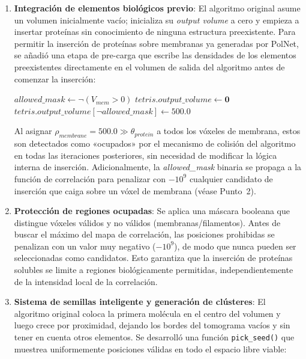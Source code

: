 \begin{enumerate}
    \item \textbf{Integración de elementos biológicos previo}: El algoritmo original asume un volumen inicialmente vacío; inicializa su \textit{output volume} a cero y empieza a insertar proteínas sin conocimiento de ninguna estructura preexistente. Para permitir la inserción de proteínas sobre membranas ya generadas por PolNet, se añadió una etapa de pre-carga que escribe las densidades de los elementos preexistentes directamente en el volumen de salida del algoritmo antes de comenzar la inserción:

    \begin{algorithm}[H]
        \caption{Pre-carga de membrana en el volumen Tetris}
        \label{alg:preload}
        $allowed\_mask \gets \lnot(V_{mem} > 0)$ 
        $tetris.output\_volume \gets \mathbf{0}$ 
        $tetris.output\_volume[\lnot allowed\_mask] \gets 500.0$ 
    \end{algorithm}

    Al asignar $\rho_{membrane} = 500.0 \gg \theta_{protein}$ a todos los vóxeles de membrana, estos son detectados como «ocupados» por el mecanismo de colisión del algoritmo en todas las iteraciones posteriores, sin necesidad de modificar la lógica interna de inserción. Adicionalmente, la \textit{allowed\_mask} binaria se propaga a la función de correlación para penalizar con $-10^9$ cualquier candidato de inserción que caiga sobre un vóxel de membrana (véase Punto~2).

    \item \textbf{Protección de regiones ocupadas}: Se aplica una máscara booleana que distingue vóxeles válidos y no válidos (membranas/filamentos). Antes de buscar el máximo del mapa de correlación, las posiciones prohibidas se penalizan con un valor muy negativo ($-10^9$), de modo que nunca pueden ser seleccionadas como candidatos. Esto garantiza que la inserción de proteínas solubles se limite a regiones biológicamente permitidas, independientemente de la intensidad local de la correlación.

    \item \textbf{Sistema de semillas inteligente y generación de clústeres}: El algoritmo original coloca la primera molécula en el centro del volumen y luego crece por proximidad, dejando los bordes del tomograma vacíos y sin tener en cuenta otros elementos. Se desarrolló una función \texttt{pick\_seed()} que muestrea uniformemente posiciones válidas en todo el espacio libre viable:


\end{enumerate}
